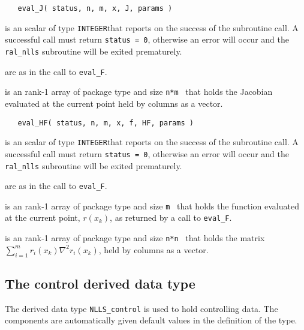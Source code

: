 \documentclass{hslspec}
\newcommand{\scalarintegerio}{is an \intentout scalar of type {\tt INTEGER}}
\newcommand{\ronearrayrealii}[1]{is an \intentin rank-1 array of package type and size {\tt #1}\ }
\newcommand{\ronearrayrealio}[1]{is an \intentout rank-1 array of package type and size {\tt #1}\ }
\begin{document}
\begin{verbatim}
   eval_J( status, n, m, x, J, params )
\end{verbatim}

\begin{description}
   \scalarintegerio that reports on the success of the subroutine call.  A successful call must return {\tt status = 0}, otherwise an error will occur and the {\tt ral\_nlls} subroutine will be exited prematurely.

   are as in the call to {\tt eval\_F}.

  
   \ronearrayrealio{n*m} that holds the Jacobian evaluated at the current point held by columns as a vector.
  
\end{description}

\begin{verbatim}
   eval_HF( status, n, m, x, f, HF, params )
\end{verbatim}

\begin{description}
   \scalarintegerio that reports on the success of the subroutine call.  A successful call must return {\tt status = 0}, otherwise an error will occur and the {\tt ral\_nlls} subroutine will be exited prematurely.

   are as in the call to {\tt eval\_F}.

  
   \ronearrayrealii{m} that holds the function evaluated at the current point, $r(x_k)$, as returned by a call to {\tt eval\_F}.

   \ronearrayrealio{n*n} that holds the matrix $\sum_{i = 1}^m r_i(x_k)\nabla^2r_i(x_k)$, held by columns as a vector.
  
\end{description}



\subsection{The control derived data type}
\label{typecontrol} 

The derived data type {\tt NLLS\_control} 
is used to hold controlling data. The components  are automatically 
given default values in the definition of the type.

\vspace{2mm}
\end{document}
